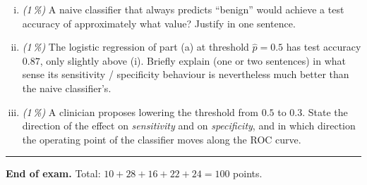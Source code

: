 \documentclass[11pt,a4paper]{article}
\newcommand{\subpoints}[1]{\textit{(#1\,\%)}}
\begin{document}
\begin{enumerate}[(i)]
  \item \subpoints{1} A naive classifier that always predicts ``benign'' would achieve a test accuracy of approximately what value? Justify in one sentence.
  \item \subpoints{1} The logistic regression of part (a) at threshold $\hat p = 0.5$ has test accuracy $0.87$, only slightly above (i). Briefly explain (one or two sentences) in what sense its sensitivity / specificity behaviour is nevertheless much better than the naive classifier's.
  \item \subpoints{1} A clinician proposes lowering the threshold from $0.5$ to $0.3$. State the direction of the effect on \emph{sensitivity} and on \emph{specificity}, and in which direction the operating point of the classifier moves along the ROC curve.
\end{enumerate}

\vspace{1em}
\hrule
\vspace{0.5em}

\noindent\textbf{End of exam.} \quad Total: $10 + 28 + 16 + 22 + 24 = 100$ points.
\end{document}
